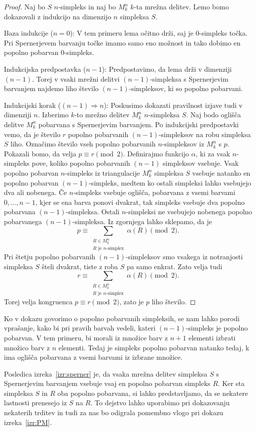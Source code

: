 \documentclass[mat1]{fmfdelo}
\newcommand{\0}{0}
\begin{document}
\begin{proof}
Naj bo $S$ $n$-simpleks in naj bo $M_k^n$ $k$-ta mrežna delitev. Lemo bomo dokazovali z indukcijo na dimenzijo $n$ simpleksa $S$.

Baza indukcije ($n = 0$):
V tem primeru lema očitno drži, saj je $0$-simpleks točka. Pri Spernerjevem barvanju točke imamo samo eno možnost in tako dobimo en popolno pobarvan $0$-simpleks.

Indukcijska predpostavka ($n - 1$):
Predpostavimo, da lema drži v dimenziji $(n - 1)$. Torej v vsaki mrežni delitvi $(n - 1)$-simpleksa s Spernerjevim barvanjem najdemo liho število $(n - 1)$-simpleksov, ki so popolno pobarvani.

Indukcijski korak ($(n - 1) \Longrightarrow n$):
Poskusimo dokazati pravilnost izjave tudi v dimenziji $n$. Izberimo $k$-to mrežno delitev $M_k^n$ $n$-simpleksa $S$. Naj bodo oglišča delitve $M_k^n$ pobarvana s Spernerjevim barvanjem. Po indukcijski predpostavki vemo, da je število $r$ popolno pobarvanih $(n-1)$-simpleksov na robu simpleksa $S$ liho. Označimo število vseh popolno pobarvanih $n$-simpleksov iz $M_k^n$ s $p$. Pokazali bomo, da velja $p \equiv r \pmod 2$.
Definirajmo funkcijo $\alpha$, ki za vsak $n$-simpleks pove, koliko popolno pobarvanih $(n-1)$ simpleksov vsebuje. Vsak popolno pobarvan $n$-simpleks iz triangulacije $M_k^n$ simpleksa $S$ vsebuje natanko en popolno pobarvan $(n-1)$-simpleks, medtem ko ostali simpleksi lahko vsebujejo dva ali nobenega. Če $n$-simpleks vsebuje oglišča, pobarvana z vsemi barvami $0, \dots, n-1$, kjer se ena barva ponovi dvakrat, tak simpleks vsebuje dva popolno pobarvana $(n-1)$-simpleksa. Ostali $n$-simpleksi ne vsebujejo nobenega popolno pobarvanega $(n - 1)$-simpleksa. Iz zgornjega lahko sklepamo, da je 
$$p \equiv 
\sum\limits_{\substack{
R \in M_k^n
 \\ 
R\text{ je } n\text{-simplex}
 }} 
 \alpha(R) \pmod 2.$$
Pri štetju popolno pobarvanih $(n - 1)$-simpleksov smo vsakega iz notranjosti simpleksa $S$ šteli dvakrat, tiste z roba $S$ pa samo enkrat. Zato velja tudi 
$$r \equiv 
\sum\limits_{\substack{
R \in M_k^n
 \\ 
R\text{ je } n\text{-simplex}
 }}
  \alpha(R) \pmod 2.$$ 
Torej velja kongruenca $p \equiv r \pmod 2$, zato je $p$ liho število.
\end{proof}
\begin{opomba}
Ko v dokazu govorimo o popolno pobarvanih simpleksih, se nam lahko porodi vprašanje, kako bi pri pravih barvah vedeli, kateri $(n-1)$-simpleks je popolno pobarvan. V tem primeru, bi morali iz množice barv z $n+1$ elementi izbrati množico barv z $n$ elementi. Tedaj je simpleks popolno pobarvan natanko tedaj, k ima oglišča pobarvana z vsemi barvami iz izbrane množice.
\end{opomba}
Posledica izreka~\ref{izr:sperner} je, da vsaka mrežna delitev simpleksa $S$ s Spernerjevim barvanjem vsebuje vsaj en popolno pobarvan simpleks $R$. Ker sta simpleksa $S$ in $R$ oba popolno pobarvana, si lahko predstavljamo, da se nekatere lastnosti prenesejo iz $S$ na $R$. To dejstvo lahko uporabimo pri dokazovanju nekaterih trditev in tudi za nas bo odigrala pomembno vlogo pri dokazu izreka~\ref{izr:PM}. 
\end{document}
